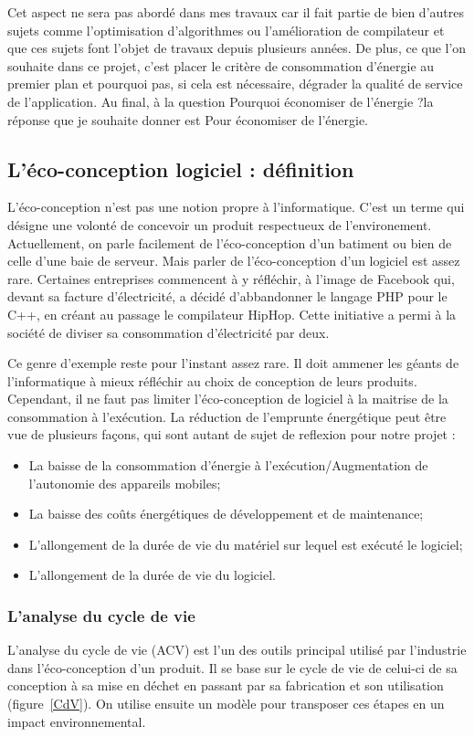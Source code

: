 \documentclass[a4paper, 11pt]{report}
\begin{document}
Cet aspect ne sera pas abordé dans mes travaux car il fait partie de bien d'autres sujets comme l'optimisation d'algorithmes ou l'amélioration de compilateur et que ces sujets font l'objet de travaux depuis plusieurs années. De plus, ce que l'on souhaite dans ce projet, c'est placer le critère de consommation d'énergie au premier plan et pourquoi pas, si cela est nécessaire, dégrader la qualité de service de l'application. Au final, à la question \og Pourquoi économiser de l'énergie ?\fg la réponse que je souhaite donner est \og Pour économiser de l'énergie\fg.
		
		\subsection{L'éco-conception logiciel : définition}
L'éco-conception n'est pas une notion propre à l'informatique. C'est un terme qui désigne une volonté de concevoir un produit respectueux de l'environement. Actuellement, on parle facilement de l'éco-conception d'un batiment ou bien de celle d'une baie de serveur. Mais parler de l'éco-conception d'un logiciel est assez rare. Certaines entreprises commencent à y réfléchir, à l'image de Facebook qui, devant sa facture d'électricité, a décidé d'abbandonner le langage PHP pour le C++, en créant au passage le compilateur HipHop. Cette initiative a permi à la société de diviser sa consommation d'électricité par deux.

Ce genre d'exemple reste pour l'instant assez rare. Il doit ammener les géants de l'informatique à mieux réfléchir au choix de conception de leurs produits. Cependant, il ne faut pas limiter l'éco-conception de logiciel à la maitrise de la consommation à l'exécution. La réduction de l’emprunte énergétique peut être vue de plusieurs façons, qui sont autant de sujet de reflexion pour notre projet :
\begin{itemize}
	\item La baisse de la consommation d’énergie à l'exécution/Augmentation de l’autonomie des appareils mobiles;
	\item La baisse des coûts énergétiques de développement et de maintenance;
	\item L'allongement de la durée de vie du matériel sur lequel est exécuté le logiciel;
	\item L'allongement de la durée de vie du logiciel.
\end{itemize}

			\subsubsection{L'analyse du cycle de vie}
L'analyse du cycle de vie (ACV) est l'un des outils principal utilisé par l'industrie dans l'éco-conception d'un produit. Il se base sur le cycle de vie de celui-ci de sa conception à sa mise en déchet en passant par sa fabrication et son utilisation (figure~\ref{CdV}). On utilise ensuite un modèle pour transposer ces étapes en un impact environnemental.
\end{document}
